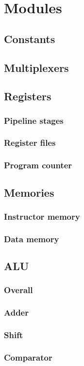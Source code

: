 \documentclass[11pt, a4paper, twoside]{article}
\begin{document}
\section{Modules}
\subsection{Constants}
\subsection{Multiplexers}
\subsection{Registers}
\subsubsection{Pipeline stages}
\subsubsection{Register files}
\subsubsection{Program counter}
\subsection{Memories}
\subsubsection{Instructor memory}
\subsubsection{Data memory}
\subsection{ALU}
\subsubsection{Overall}
\subsubsection{Adder}
\subsubsection{Shift}
\subsubsection{Comparator}
\end{document}
